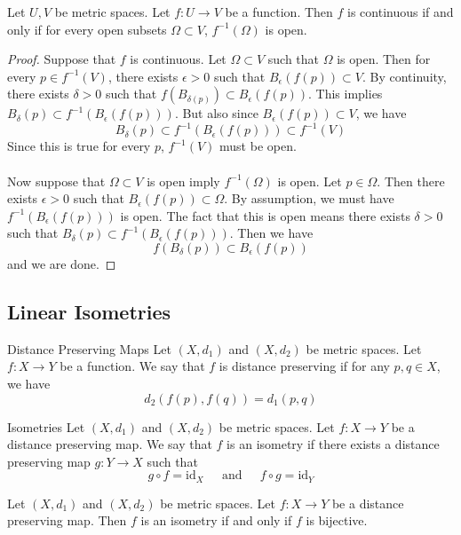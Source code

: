 \documentclass[a4paper]{article}
\begin{document}
\begin{thm}{}{} Let $U,V$ be metric spaces. Let $f:U\to V$ be a function. Then $f$ is continuous if and only if for every open subsets $\Omega\subset V$, $f^{-1}(\Omega)$ is open. \tcbline
\begin{proof} Suppose that $f$ is continuous. Let $\Omega\subset V$ such that $\Omega$ is open. Then for every $p\in f^{-1}(V)$, there exists $\epsilon>0$ such that $B_{\epsilon}(f(p))\subset V$. By continuity, there exists $\delta>0$ such that $f(B_{\delta(p)})\subset B_{\epsilon}(f(p))$. This implies $B_{\delta}(p)\subset f^{-1}(B_{\epsilon}(f(p)))$. But also since $B_{\epsilon}(f(p))\subset V$, we have $$B_{\delta}(p)\subset f^{-1}(B_{\epsilon}(f(p)))\subset f^{-1}(V)$$ Since this is true for every $p$, $f^{-1}(V)$ must be open. \\~\\
Now suppose that $\Omega\subset V$ is open imply $f^{-1}(\Omega)$ is open. Let $p\in \Omega$. Then there exists $\epsilon>0$ such that $B_{\epsilon}(f(p))\subset\Omega$. By assumption, we must have $f^{-1}(B_{\epsilon}(f(p)))$ is open. The fact that this is open means there exists $\delta>0$ such that $B_{\delta}(p)\subset f^{-1}(B_{\epsilon}(f(p)))$. Then we have $$f(B_{\delta}(p))\subset B_{\epsilon}(f(p))$$
and we are done. 
\end{proof}
\end{thm}

\subsection{Linear Isometries}
\begin{defn}{Distance Preserving Maps}{} Let $(X,d_1)$ and $(X,d_2)$ be metric spaces. Let $f:X\to Y$ be a function. We say that $f$ is distance preserving if for any $p,q\in X$, we have $$d_2(f(p),f(q))=d_1(p,q)$$
\end{defn}

\begin{defn}{Isometries}{} Let $(X,d_1)$ and $(X,d_2)$ be metric spaces. Let $f:X\to Y$ be a distance preserving map. We say that $f$ is an isometry if there exists a distance preserving map $g:Y\to X$ such that $$g\circ f=\text{id}_X\;\;\;\;\text{ and }\;\;\;\;f\circ g=\text{id}_Y$$
\end{defn}

\begin{lmm}{}{} Let $(X,d_1)$ and $(X,d_2)$ be metric spaces. Let $f:X\to Y$ be a distance preserving map. Then $f$ is an isometry if and only if $f$ is bijective. 
\end{lmm}
\end{document}
